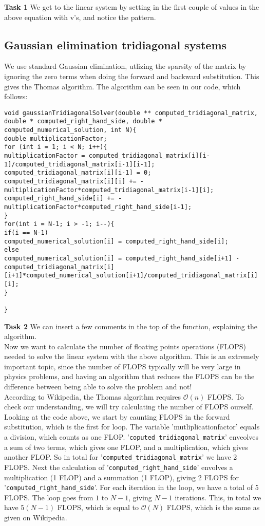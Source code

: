 \documentclass{article}
\begin{document}
\textbf{Task 1} We get to the linear system by setting in the first couple of values in the above equation with v's, and notice the pattern. 

\subsection{Gaussian elimination tridiagonal systems}
We use standard Gaussian elimination, utlizing the sparsity of the matrix by ignoring the zero terms when doing the forward and backward substitution. This gives the Thomas algorithm. The algorithm can be seen in our code, which follows:

\begin{lstlisting}
void gaussianTridiagonalSolver(double ** computed_tridiagonal_matrix, double * computed_right_hand_side, double * computed_numerical_solution, int N){
double multiplicationFactor;
for (int i = 1; i < N; i++){
multiplicationFactor = computed_tridiagonal_matrix[i][i-1]/computed_tridiagonal_matrix[i-1][i-1];
computed_tridiagonal_matrix[i][i-1] = 0;
computed_tridiagonal_matrix[i][i] += - multiplicationFactor*computed_tridiagonal_matrix[i-1][i];
computed_right_hand_side[i] += - multiplicationFactor*computed_right_hand_side[i-1];
}
for(int i = N-1; i > -1; i--){
if(i == N-1)
computed_numerical_solution[i] = computed_right_hand_side[i];
else
computed_numerical_solution[i] = computed_right_hand_side[i+1] - computed_tridiagonal_matrix[i][i+1]*computed_numerical_solution[i+1]/computed_tridiagonal_matrix[i][i];
}

}
\end{lstlisting}

\textbf{Task 2} We can insert a few comments in the top of the function, explaining the algorithm. \\

Now we want to calculate the number of floating points operations (FLOPS) needed to solve the linear system with the above algorithm. This is an extremely important topic, since the number of FLOPS typically will be very large in physics problems, and having an algorithm that reduces the FLOPS can be the difference between being able to solve the problem and not!\\

According to Wikipedia, the Thomas algorithm requires $\mathcal{O}(n)$ FLOPS. To check our understanding, we will try calculating the number of FLOPS ourself. Looking at the code above, we start by caunting FLOPS in the forward substitution, which is the first for loop. The variable 'mutliplicationfactor' equals a division, which counts as one FLOP. '\texttt{coputed\_tridiagonal\_matrix}' enveolves a sum of two terms, which gives one FLOP, and a multiplication, which gives another FLOP. So in total for '\texttt{computed\_tridiagonal\_matrix}' we have 2 FLOPS. Next the calculation of '\texttt{computed\_right\_hand\_side}' envolves a multiplication (1 FLOP) and a summation (1 FLOP), giving 2 FLOPS for '\texttt{computed\_right\_hand\_side}'. For each iteration in the loop, we have a total of 5 FLOPS. The loop goes from $1$ to $N-1$, giving $N-1$ iterations. This, in total we have $5(N-1)$ FLOPS, which is equal to $\mathcal{O}(N)$ FLOPS, which is the same as given on Wikipedia.
\end{document}
